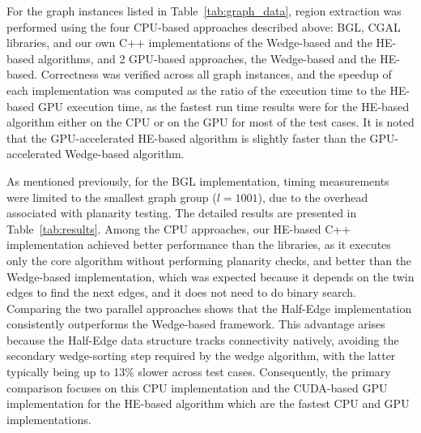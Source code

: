 
For the graph instances listed in Table~\ref{tab:graph_data}, region extraction was performed using the four CPU-based approaches described above: BGL, CGAL libraries, and our own C++ implementations of the Wedge-based and the HE-based algorithms, and 2 GPU-based approaches, the Wedge-based and the HE-based. Correctness was verified across all graph instances, and the speedup of each implementation was computed as the ratio of the execution time to the HE-based GPU execution time, as the fastest run time results were for the HE-based algorithm either on the CPU or on the GPU for most of the test cases. It is noted that the GPU-accelerated HE-based algorithm is slightly faster than the GPU-accelerated Wedge-based algorithm. 

As mentioned previously, for the BGL implementation, timing measurements were limited to the smallest graph group ($l = 1001$), due to the overhead associated with planarity testing. The detailed results are presented in Table~\ref{tab:results}. Among the CPU approaches, our HE-based C++ implementation achieved better performance than the libraries, as it executes only the core algorithm without performing planarity checks, and better than the Wedge-based implementation, which was expected because it depends on the twin edges to find the next edges, and it does not need to do binary search. Comparing the two parallel approaches shows that the Half-Edge implementation consistently outperforms the Wedge-based framework. This advantage arises because the Half-Edge data structure tracks connectivity natively, avoiding the secondary wedge-sorting step required by the wedge algorithm, with the latter typically being up to 13\% slower across test cases. Consequently, the primary comparison focuses on this CPU implementation and the CUDA-based GPU implementation for the HE-based algorithm which are the fastest CPU and GPU implementations.

